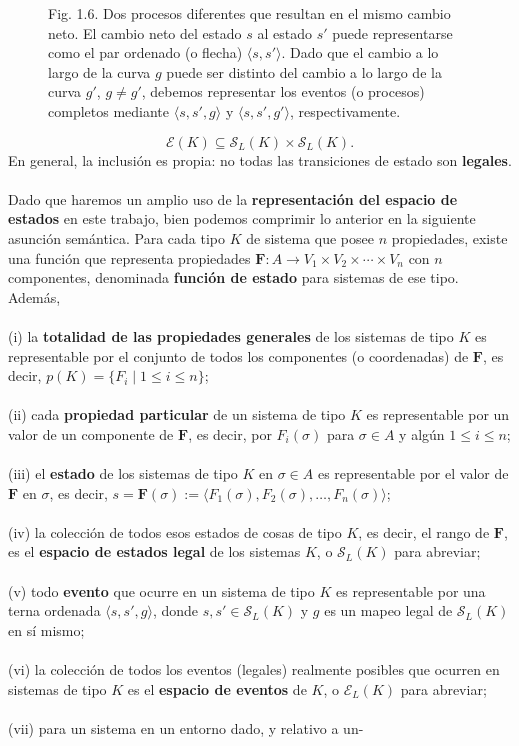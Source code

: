 {\fontsize{13}{15}\selectfont
\begin{figure}[h!]
    \centering
    \caption*{Fig. 1.6. Dos procesos diferentes que resultan en el mismo cambio neto. El cambio neto del estado $s$ al estado $s'$ puede representarse como el par ordenado (o flecha) $\langle s, s' \rangle$. Dado que el cambio a lo largo de la curva $g$ puede ser distinto del cambio a lo largo de la curva $g'$, $g \neq g'$, debemos representar los eventos (o procesos) completos mediante $\langle s, s', g \rangle$ y $\langle s, s', g' \rangle$, respectivamente.}
\end{figure}
$$ \mathcal{E}(K) \subseteq \mathcal{S}_L(K) \times \mathcal{S}_L(K). $$En general, la inclusión es propia: no todas las transiciones de estado son \textbf{legales}.
\\
\\
Dado que haremos un amplio uso de la \textbf{representación del espacio de estados} en este trabajo, bien podemos comprimir lo anterior en la siguiente asunción semántica. Para cada tipo $K$ de sistema que posee $n$ propiedades, existe una función que representa propiedades $\mathbf{F}: A \longrightarrow V_1 \times V_2 \times \cdots \times V_n$ con $n$ componentes, denominada \textbf{función de estado} para sistemas de ese tipo. Además,
\\\\
(i) la \textbf{totalidad de las propiedades generales} de los sistemas de tipo $K$ es representable por el conjunto de todos los componentes (o coordenadas) de $\mathbf{F}$, es decir, $p(K) = \{F_i \mid 1 \le i \le n\}$;
\\\\
(ii) cada \textbf{propiedad particular} de un sistema de tipo $K$ es representable por un valor de un componente de $\mathbf{F}$, es decir, por $F_i(\sigma)$ para $\sigma \in A$ y algún $1 \le i \le n$;
\\\\
(iii) el \textbf{estado} de los sistemas de tipo $K$ en $\sigma \in A$ es representable por el valor de $\mathbf{F}$ en $\sigma$, es decir, $s = \mathbf{F}(\sigma) := \langle F_1(\sigma), F_2(\sigma), \ldots, F_n(\sigma) \rangle$;
\\\\
(iv) la colección de todos esos estados de cosas de tipo $K$, es decir, el rango de $\mathbf{F}$, es el \textbf{espacio de estados legal} de los sistemas $K$, o $\mathcal{S}_L(K)$ para abreviar;
\\\\
(v) todo \textbf{evento} que ocurre en un sistema de tipo $K$ es representable por una terna ordenada $\langle s, s', g \rangle$, donde $s, s' \in \mathcal{S}_L(K)$ y $g$ es un mapeo legal de $\mathcal{S}_L(K)$ en sí mismo;
\\\\
(vi) la colección de todos los eventos (legales) realmente posibles que ocurren en sistemas de tipo $K$ es el \textbf{espacio de eventos} de $K$, o $\mathcal{E}_L(K)$ para abreviar;
\\\\
(vii) para un sistema en un entorno dado, y relativo a un-
}

